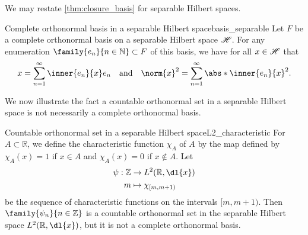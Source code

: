We may restate \cref{thm:closure_basis} for separable Hilbert spaces.
\begin{theorem}{Complete orthonormal basis in a separable Hilbert space}{basis_separable}
    Let \(F\) be a complete orthonormal basis on a separable Hilbert space \(\mathscr{H}\). For any enumeration \(\family{e_n}{n\in \mathbb{N}} \subset F\) of this basis, we have for all \(x \in \mathscr{H}\) that
    \begin{equation*}
        x = \sum_{n=1}^\infty \inner{e_n}{x}e_n\quad\text{and}\quad
        \norm{x}^2 = \sum_{n=1}^\infty \abs*{\inner{e_n}{x}}^2.
    \end{equation*}
\end{theorem}

We now illustrate the fact a countable orthonormal set in a separable Hilbert space is not necessarily a complete orthonormal basis.
\begin{example}{Countable orthonormal set in a separable Hilbert space}{L2_characteristic}
    For \(A \subset \mathbb{R}\), we define the characteristic function \(\chi_A\) of \(A\) by the map defined by \(\chi_A(x) = 1\) if \(x \in A\) and \(\chi_A(x) = 0\) if \(x \notin A\). Let
    \begin{align*}
        \psi : \mathbb{Z} &\to L^2(\mathbb{R}, \dl{x})\\
                        m &\mapsto \chi_{[m, m+1)}
    \end{align*}
    be the sequence of characteristic functions on the intervals \([m, m+1)\). Then \(\family{\psi_n}{n\in \mathbb{Z}}\) is a countable orthonormal set in the separable Hilbert space \(L^2(\mathbb{R}, \dl{x})\), but it is not a complete orthonormal basis.
\end{example}
